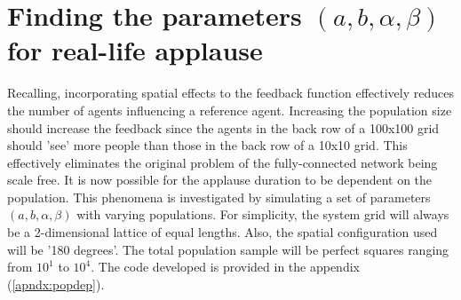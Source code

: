 \section{Finding the parameters $(a,b,\alpha,\beta)$ for real-life applause}

\hspace{\parindent}Recalling, incorporating spatial effects to the feedback function effectively reduces the number of agents influencing a reference agent. Increasing the population size should increase the feedback since the agents in the back row of a 100x100 grid should 'see' more people than those in the back row of a 10x10 grid. 
This effectively eliminates the original problem of the fully-connected network being scale free.
It is now possible for the applause duration to be dependent on the population.
This phenomena is investigated by simulating a set of parameters $(a,b,\alpha,\beta)$ with varying populations.
For simplicity, the system grid will always be a 2-dimensional lattice of equal lengths.
Also, the spatial configuration used will be '180 degrees'.
The total population sample will be perfect squares ranging from $10^1$ to $10^4$.
The code developed is provided in the appendix (\ref{apndx:popdep}).
